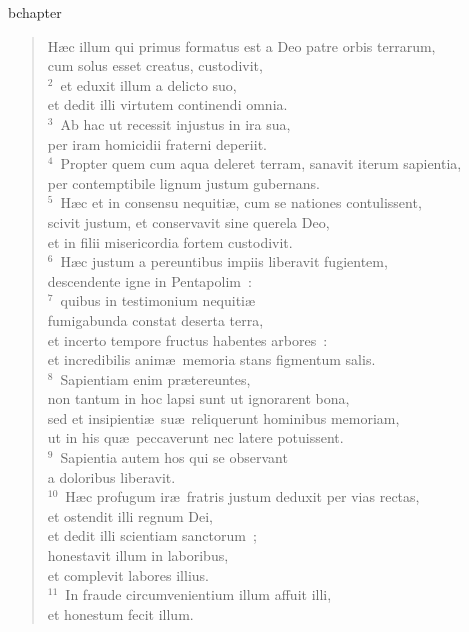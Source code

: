 bchapter\begin{verse}\vspace{-19pt}H\ae c illum qui primus formatus est a Deo patre orbis terrarum,\\ cum solus esset creatus, custodivit,\\
${}^{2}$~et eduxit illum a delicto suo,\\ et dedit illi virtutem continendi omnia.\\
${}^{3}$~Ab hac ut recessit injustus in ira sua,\\ per iram homicidii fraterni deperiit.\\
${}^{4}$~Propter quem cum aqua deleret terram, sanavit iterum sapientia,\\ per contemptibile lignum justum gubernans.\\
${}^{5}$~H\ae c et in consensu nequiti\ae , cum se nationes contulissent,\\ scivit justum, et conservavit sine querela Deo,\\ et in filii misericordia fortem custodivit.\\
${}^{6}$~H\ae c justum a pereuntibus impiis liberavit fugientem,\\ descendente igne in Pentapolim~:\\
${}^{7}$~quibus in testimonium nequiti\ae \\ fumigabunda constat deserta terra,\\ et incerto tempore fructus habentes arbores~:\\ et incredibilis anim\ae\ memoria stans figmentum salis.\\
${}^{8}$~Sapientiam enim pr\ae tereuntes,\\ non tantum in hoc lapsi sunt ut ignorarent bona,\\ sed et insipienti\ae\ su\ae\ reliquerunt hominibus memoriam,\\ ut in his qu\ae\ peccaverunt nec latere potuissent.\\
${}^{9}$~Sapientia autem hos qui se observant\\ a doloribus liberavit.\\
${}^{10}$~H\ae c profugum ir\ae\ fratris justum deduxit per vias rectas,\\ et ostendit illi regnum Dei,\\ et dedit illi scientiam sanctorum~;\\ honestavit illum in laboribus,\\ et complevit labores illius.\\
${}^{11}$~In fraude circumvenientium illum affuit illi,\\ et honestum fecit illum.\\

\end{verse}

